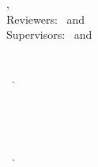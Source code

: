 \hfill
\vfill
{
    \small
    \textbf{\thesisName} \\
    \textit{\thesisTitle} \\
    \thesisSubject, \thesisDate \\
    Reviewers: \thesisFirstReviewer\ and \thesisSecondReviewer \\
    Supervisors: \thesisFirstSupervisor\ and \thesisSecondSupervisor \\[1.5em]
    
    \textbf{\thesisUniversityA} \\
    \textit{\thesisUniversityGroupA} \\
    \thesisUniversityInstituteA\ $\cdot$ \thesisUniversityDepartmentA \\
    \thesisUniversityStreetAddressA \\
    \thesisUniversityPostalCodeA\ \thesisUniversityCityA \\[1em]
    
    \textbf{\thesisUniversityB} \\
    \textit{\thesisUniversityGroupB} \\
    \thesisUniversityInstituteB\ $\cdot$ \thesisUniversityDepartmentB \\
    \thesisUniversityStreetAddressB \\
    \thesisUniversityPostalCodeB\ \thesisUniversityCityB
}
\fi